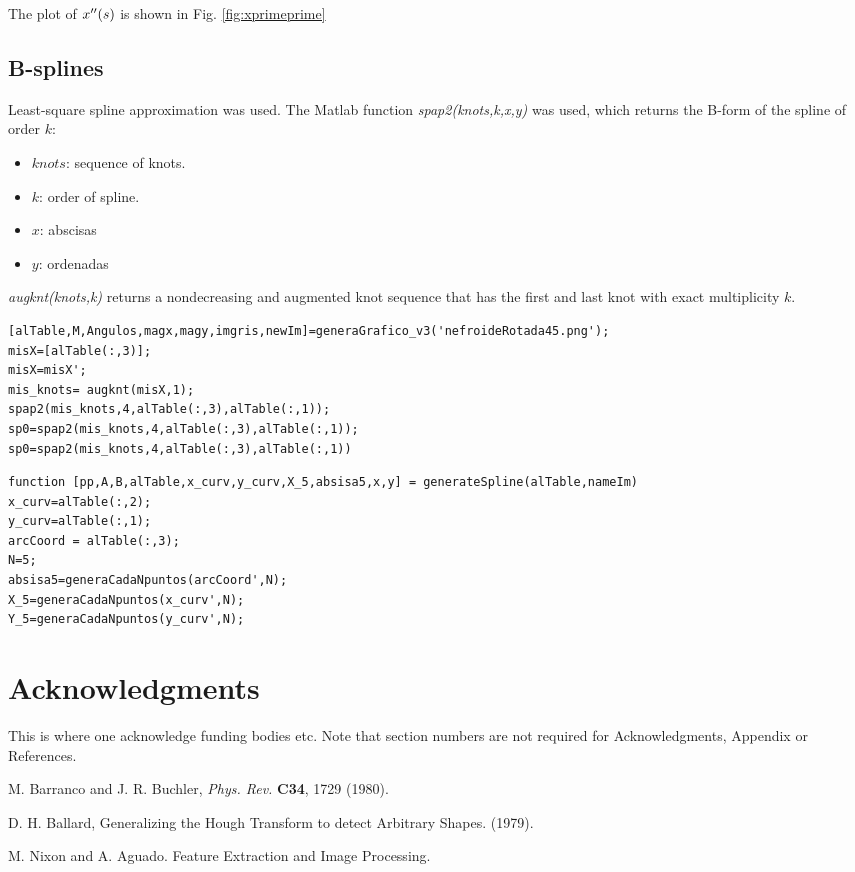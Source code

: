 \documentclass{ws-procs9x6}
\begin{document}
The plot of  $x\sp{\prime\prime}(s)$ is shown in Fig. \ref{fig:xprimeprime}

\begin{figure}[h!tpb]
  \centering

\end{figure}

\subsection{B-splines}
Least-square spline approximation was used. 
The Matlab function \emph{spap2(knots,k,x,y)} was used, which returns the B-form of the spline of order $k$:
\begin{itemize}
\item $knots$: sequence of knots.
\item $k$: order of spline.
\item $x$: abscisas
\item $y$: ordenadas
\end{itemize}

\emph{augknt(knots,k)} returns a nondecreasing and augmented knot sequence that has the first and last knot with exact multiplicity $k$. 

\begin{verbatim}
[alTable,M,Angulos,magx,magy,imgris,newIm]=generaGrafico_v3('nefroideRotada45.png');
misX=[alTable(:,3)];
misX=misX';
mis_knots= augknt(misX,1);
spap2(mis_knots,4,alTable(:,3),alTable(:,1));
sp0=spap2(mis_knots,4,alTable(:,3),alTable(:,1));
sp0=spap2(mis_knots,4,alTable(:,3),alTable(:,1))
\end{verbatim}

\begin{verbatim}
function [pp,A,B,alTable,x_curv,y_curv,X_5,absisa5,x,y] = generateSpline(alTable,nameIm)
x_curv=alTable(:,2);
y_curv=alTable(:,1);
arcCoord = alTable(:,3);
N=5;
absisa5=generaCadaNpuntos(arcCoord',N);
X_5=generaCadaNpuntos(x_curv',N);
Y_5=generaCadaNpuntos(y_curv',N);
\end{verbatim}



\newpage

\section*{Acknowledgments}
This is where one acknowledge funding bodies etc.  Note that section
numbers are not required for Acknowledgments, Appendix or References.





\begin{thebibliography}{0}
 M. Barranco and J. R. Buchler, {\it Phys. Rev.}
{\bf C34}, 1729 (1980).

 D. H. Ballard, Generalizing the Hough Transform to
  detect Arbitrary Shapes. (1979).

 M. Nixon and A. Aguado. Feature Extraction and Image
  Processing.

\end{thebibliography}
\end{document}
